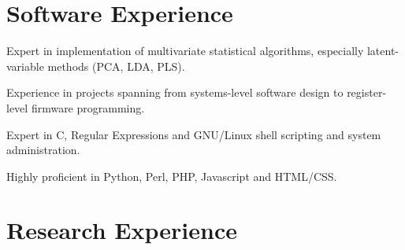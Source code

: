 \documentclass[letterpaper]{article}
\renewenvironment{itemize}{
  \begin{list}{}{
    \setlength{\leftmargin}{1.5em}
  }
}{
  \end{list}
}
\begin{document}
\section*{Software Experience}

\begin{itemize}
\item{
  Expert in implementation of multivariate statistical algorithms,
  especially latent-variable methods (PCA, LDA, PLS).
}
\item{
  Experience in projects spanning from systems-level software design to
  register-level firmware programming.
}
\item{
  Expert in C, Regular Expressions and GNU/Linux shell scripting and
  system administration.
}
\item{
  Highly proficient in Python, Perl, PHP, Javascript and HTML/CSS.
}
\end{itemize}


\section*{Research Experience}
\end{document}
